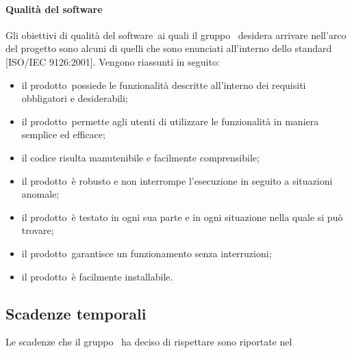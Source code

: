 \documentclass[../PianoDiQualifica.tex]{subfiles}
\begin{document}
			\paragraph{Qualità del software}
			Gli obiettivi di qualità del software\g\ ai quali il gruppo \leaf\ desidera arrivare nell'arco del progetto sono alcuni di quelli che sono enunciati all'interno dello standard [ISO/IEC 9126:2001]. Vengono riassunti in seguito:
			\begin{itemize}
				\item il prodotto\g\ possiede le funzionalità descritte all'interno dei requisiti obbligatori e desiderabili;
				\item il prodotto\g\ permette agli utenti di utilizzare le funzionalità in maniera semplice ed efficace;
				\item il codice risulta manutenibile e facilmente comprensibile;
				\item il prodotto\g\ è robusto e non interrompe l'esecuzione in seguito a situazioni anomale;
				\item il prodotto\g\ è testato in ogni sua parte e in ogni situazione nella quale si può trovare;
				\item il prodotto\g{}arantisce un funzionamento senza interruzioni;
				\item il prodotto\g\ è facilmente installabile.
			\end{itemize}
	\subsection{Scadenze temporali}
	Le scadenze che il gruppo \leaf\ ha deciso di rispettare sono riportate nel \pianodiprogettov
\end{document}
